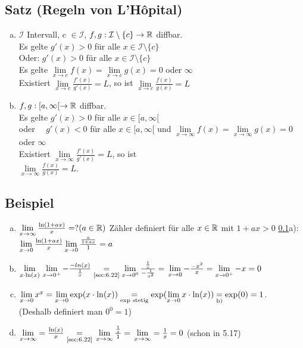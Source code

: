 \subsection{Satz (Regeln von L'Hôpital)} \label{sec:6.22}
\begin{enumerate}[a)]
	\item $\mathcal{I}$ Intervall, c $\in \mathcal{I}$, $f,g: \mathcal{I} \setminus \{c\} \to \mathbb{R} $ diffbar.\\
	Es gelte $g'(x) > 0$ für alle $ x \in \mathcal{I} \setminus \{c\}$\\
	Oder\quad : $g'(x) > 0$ für alle $ x \in \mathcal{I} \setminus \{c\}$\\
	Es gelte $\lim\limits_{x \to c} f(x) = \lim\limits_{x \to c} g(x) = 0$ oder $ \infty$\\
	Existiert $\lim\limits_{x \to c} \frac{f'(x)}{g'(x)} = L$, so ist $\lim\limits_{x \to c} \frac{f(x)}{g(x)} = L$
	\item $f,g : [a,\infty[ \to \mathbb{R} $ diffbar.\\
	Es gelte $ g'(x) > 0$ für alle $x \in [a,\infty[ $\\
	oder \ \ \quad $g'(x) < 0$ für alle $x \in [a,\infty[ $
	und $\lim\limits_{x \to \infty} f(x) = \lim\limits_{x \to \infty} g(x) = 0 $ oder $\infty$ \\
	Existiert $\lim\limits_{x \to \infty} \frac{f'(x)}{g'(x)} = L$, so ist \\
	\phantom{Existiert} $\lim\limits_{x \to \infty} \frac{f(x)}{g(x)} = L.$
\end{enumerate}
\subsection{Beispiel} \label{sec:6.23}
\begin{enumerate}[a)]
	\item $\lim\limits_{x \to \infty} \frac{\ln(1 + ax)}{x} = ? (a \in \mathbb{R})$ Zähler definiert für alle $x \in \mathbb{R}$ mit $1+ax >0$ \ref{sec:6.22}a):\\
	$\lim\limits_{x \to 0} \frac{\ln(1 +ax )}{x}\\
	\lim\limits_{x \to 0} \frac{\frac{a}{1+ ax}}{1} = a$\\
	\item $\lim\limits_{x \cdot \ln(x)}\\
	\lim\limits_{x\to 0^+} - \frac{-ln(x)}{\frac{1}{x}} \underset{\text{\ref{sec:6.22}}}{=} \lim\limits_{x \to 0^0} \frac{\frac{1}{x}}{-\frac{1}{x^2}}=\\
	\lim\limits_{x \to 0}-\frac{-x^2}{x} = \lim\limits_{x \to 0^+} - x = 0 $
	\item $\lim\limits_{x \to 0} x^x = \lim\limits_{x \to 0} \exp(x \cdot \ln(x))\\
	\underset{\text{exp stetig}}{=} \exp(\lim\limits_{x \to 0} x \cdot \ln(x)) \underset{\text{b)}}{=} \exp(0) =1$.\\
	(Deshalb definiert man $0^0 = 1$)
	\item $\lim\limits_{x \to \infty} = \frac{\ln(x)}{x}  \underset{\text{\ref{sec:6.22}}}{=}\\
	\lim\limits_{x \to \infty} \frac{\frac{1}{x}}{1} =\\
	\lim\limits_{x \to \infty} = \frac{1}{x} = 0$ (schon in 5.17)
\end{enumerate}
